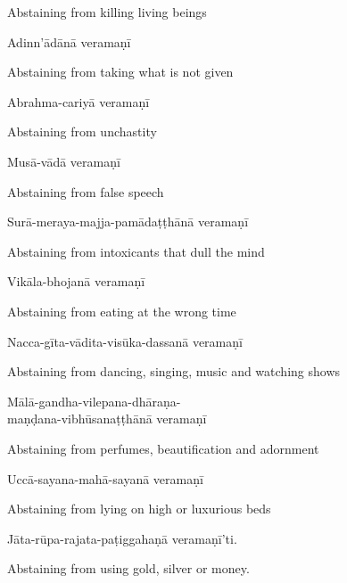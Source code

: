 \begin{cprenglish}
  Abstaining from killing living beings
\end{cprenglish}

Adinn'ādānā veramaṇī

\begin{cprenglish}
  Abstaining from taking what is not given
\end{cprenglish}

Abrahma-cariyā veramaṇī

\begin{cprenglish}
  Abstaining from unchastity
\end{cprenglish}

Musā-vādā veramaṇī

\begin{cprenglish}
  Abstaining from false speech
\end{cprenglish}

Surā-meraya-majja-pamādaṭṭhānā veramaṇī

\begin{cprenglish}
  Abstaining from intoxicants that dull the mind
\end{cprenglish}

Vikāla-bhojanā veramaṇī

\begin{cprenglish}
  Abstaining from eating at the wrong time
\end{cprenglish}

Nacca-gīta-vādita-visūka-dassanā veramaṇī

\begin{cprenglish}
  Abstaining from dancing, singing, music and watching shows
\end{cprenglish}

Mālā-gandha-vilepana-dhāraṇa-\\
\vin maṇḍana-vibhūsanaṭṭhānā veramaṇī

\begin{cprenglish}
  Abstaining from perfumes, beautification and adornment
\end{cprenglish}

Uccā-sayana-mahā-sayanā veramaṇī

\begin{cprenglish}
  Abstaining from lying on high or luxurious beds
\end{cprenglish}

Jāta-rūpa-rajata-paṭiggahaṇā veramaṇī'ti.

\begin{cprenglish}
  Abstaining from using gold, silver or money. 
\end{cprenglish}

